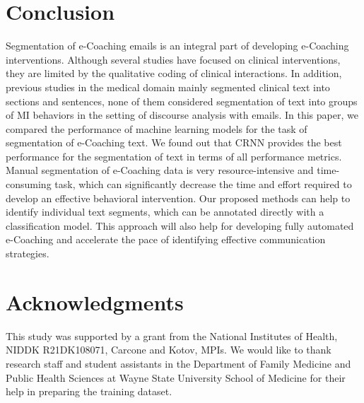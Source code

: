 \documentclass{amia}
\begin{document}
\section*{Conclusion}
Segmentation of e-Coaching emails is an integral part of developing e-Coaching interventions. Although several studies have focused on clinical interventions, they are limited by the qualitative coding of clinical interactions. In addition, previous studies in the medical domain mainly segmented clinical text into sections and sentences, none of them considered segmentation of text into groups of MI behaviors in the setting of discourse analysis with emails. In this paper, we compared the performance of machine learning models for the task of segmentation of e-Coaching text. We found out that CRNN provides the best performance for the segmentation of text in terms of all performance metrics. Manual segmentation of e-Coaching data is very resource-intensive and time-consuming task, which can significantly decrease the time and effort required to develop an effective behavioral intervention. Our proposed methods can help to identify individual text segments, which can be annotated directly with a classification model. This approach will also help for developing fully automated e-Coaching and accelerate the pace of identifying effective communication strategies.

\section*{Acknowledgments}
This study was supported by a grant from the National Institutes of Health, NIDDK R21DK108071, Carcone and Kotov, MPIs. We would like to thank research staff and student assistants in the Department of Family Medicine and Public Health Sciences at Wayne State University School of Medicine for their help in preparing the training dataset. 



\end{document}
